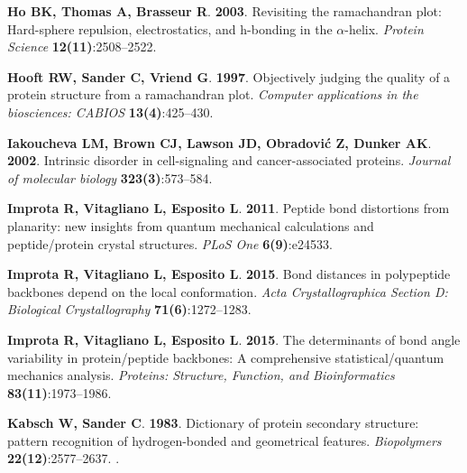 \documentclass[fleqn,10pt,lineno]{wlpeerj} %
\begin{document}
\begin{thebibliography}{58}
\textbf{Ho BK, Thomas A, Brasseur R}. \textbf{2003}.
\newblock Revisiting the ramachandran plot: Hard-sphere repulsion,
  electrostatics, and h-bonding in the $\alpha$-helix.
\newblock \emph{Protein Science} \textbf{12(11)}:2508--2522.

\textbf{Hooft RW, Sander C, Vriend G}. \textbf{1997}.
\newblock Objectively judging the quality of a protein structure from a
  ramachandran plot.
\newblock \emph{Computer applications in the biosciences: CABIOS}
  \textbf{13(4)}:425--430.

\textbf{Iakoucheva LM, Brown CJ, Lawson JD, Obradovi{\'c} Z, Dunker AK}.
  \textbf{2002}.
\newblock Intrinsic disorder in cell-signaling and cancer-associated proteins.
\newblock \emph{Journal of molecular biology} \textbf{323(3)}:573--584.

\textbf{Improta R, Vitagliano L, Esposito L}. \textbf{2011}.
\newblock Peptide bond distortions from planarity: new insights from quantum
  mechanical calculations and peptide/protein crystal structures.
\newblock \emph{PLoS One} \textbf{6(9)}:e24533.

\textbf{Improta R, Vitagliano L, Esposito L}. \textbf{2015}{}.
\newblock Bond distances in polypeptide backbones depend on the local
  conformation.
\newblock \emph{Acta Crystallographica Section D: Biological Crystallography}
  \textbf{71(6)}:1272--1283.

\textbf{Improta R, Vitagliano L, Esposito L}. \textbf{2015}{}.
\newblock The determinants of bond angle variability in protein/peptide
  backbones: A comprehensive statistical/quantum mechanics analysis.
\newblock \emph{Proteins: Structure, Function, and Bioinformatics}
  \textbf{83(11)}:1973--1986.

\textbf{Kabsch W, Sander C}. \textbf{1983}.
\newblock Dictionary of protein secondary structure: pattern recognition of
  hydrogen-bonded and geometrical features.
\newblock \emph{Biopolymers} \textbf{22(12)}:2577--2637.
\newblock {}.


\end{thebibliography}
\end{document}
